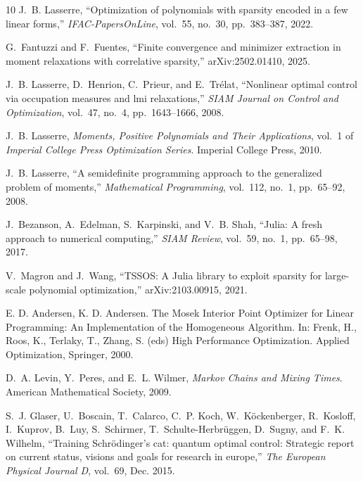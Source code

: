 \documentclass[11pt,a4paper]{article}
\theoremstyle{definition}
\begin{document}
\begin{thebibliography}{10}
J.~B. Lasserre, ``Optimization of polynomials with sparsity encoded in a few
  linear forms,'' {\em IFAC-PapersOnLine}, vol.~55, no.~30, pp.~383--387, 2022.

G.~Fantuzzi and F.~Fuentes, ``Finite convergence and minimizer extraction in
  moment relaxations with correlative sparsity,'' arXiv:2502.01410, 2025.

J.~B. Lasserre, D.~Henrion, C.~Prieur, and E.~Tr{\'e}lat, ``Nonlinear optimal
  control via occupation measures and lmi relaxations,'' {\em SIAM Journal on
  Control and Optimization}, vol.~47, no.~4, pp.~1643--1666, 2008.

J.~B. Lasserre, {\em Moments, Positive Polynomials and Their Applications},
  vol.~1 of {\em Imperial College Press Optimization Series}.
\newblock Imperial College Press, 2010.

J.~B. Lasserre, ``A semidefinite programming approach to the generalized
  problem of moments,'' {\em Mathematical Programming}, vol.~112, no.~1,
  pp.~65--92, 2008.

J.~Bezanson, A.~Edelman, S.~Karpinski, and V.~B. Shah, ``Julia: A fresh
  approach to numerical computing,'' {\em SIAM {R}eview}, vol.~59, no.~1,
  pp.~65--98, 2017.

V.~Magron and J.~Wang, ``{{TSSOS}}: A {{Julia}} library to exploit sparsity for
  large-scale polynomial optimization,'' arXiv:2103.00915, 2021.

E. D. Andersen, K. D. Andersen. The Mosek Interior Point Optimizer for Linear Programming: An Implementation of the Homogeneous Algorithm. In: Frenk, H., Roos, K., Terlaky, T., Zhang, S. (eds) High Performance Optimization. Applied Optimization,  Springer, 2000.

D.~A. Levin, Y.~Peres, and E.~L. Wilmer, {\em Markov Chains and Mixing Times}.
\newblock American Mathematical Society, 2009.

S.~J. Glaser, U.~Boscain, T.~Calarco, C.~P. Koch, W.~Köckenberger, R.~Kosloff,
  I.~Kuprov, B.~Luy, S.~Schirmer, T.~Schulte-Herbrüggen, D.~Sugny, and F.~K.
  Wilhelm, ``Training Schrödinger’s cat: quantum optimal control: Strategic
  report on current status, visions and goals for research in europe,'' {\em
  The European Physical Journal D}, vol.~69, Dec. 2015.


\end{thebibliography}
\end{document}
